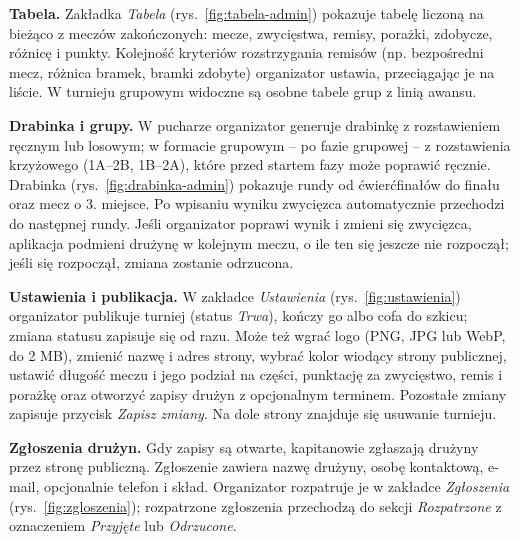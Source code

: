 \documentclass[11pt,a4paper,oneside]{article}
\begin{document}

\textbf{Tabela.} Zakładka \emph{Tabela} (rys.~\ref{fig:tabela-admin}) pokazuje tabelę liczoną na bieżąco z meczów zakończonych: mecze, zwycięstwa, remisy, porażki, zdobycze, różnicę i punkty. Kolejność kryteriów rozstrzygania remisów (np. bezpośredni mecz, różnica bramek, bramki zdobyte) organizator ustawia, przeciągając je na liście. W turnieju grupowym widoczne są osobne tabele grup z linią awansu.


\textbf{Drabinka i grupy.} W pucharze organizator generuje drabinkę z rozstawieniem ręcznym lub losowym; w formacie grupowym -- po fazie grupowej -- z rozstawienia krzyżowego (1A--2B, 1B--2A), które przed startem fazy może poprawić ręcznie. Drabinka (rys.~\ref{fig:drabinka-admin}) pokazuje rundy od ćwierćfinałów do finału oraz mecz o 3. miejsce. Po wpisaniu wyniku zwycięzca automatycznie przechodzi do następnej rundy. Jeśli organizator poprawi wynik i zmieni się zwycięzca, aplikacja podmieni drużynę w kolejnym meczu, o ile ten się jeszcze nie rozpoczął; jeśli się rozpoczął, zmiana zostanie odrzucona.


\textbf{Ustawienia i publikacja.} W zakładce \emph{Ustawienia} (rys.~\ref{fig:ustawienia}) organizator publikuje turniej (status \emph{Trwa}), kończy go albo cofa do szkicu; zmiana statusu zapisuje się od razu. Może też wgrać logo (PNG, JPG lub WebP, do 2 MB), zmienić nazwę i adres strony, wybrać kolor wiodący strony publicznej, ustawić długość meczu i jego podział na części, punktację za zwycięstwo, remis i porażkę oraz otworzyć zapisy drużyn z opcjonalnym terminem. Pozostałe zmiany zapisuje przycisk \emph{Zapisz zmiany}. Na dole strony znajduje się usuwanie turnieju.


\textbf{Zgłoszenia drużyn.} Gdy zapisy są otwarte, kapitanowie zgłaszają drużyny przez stronę publiczną. Zgłoszenie zawiera nazwę drużyny, osobę kontaktową, e-mail, opcjonalnie telefon i skład. Organizator rozpatruje je w zakładce \emph{Zgłoszenia} (rys.~\ref{fig:zgloszenia}); rozpatrzone zgłoszenia przechodzą do sekcji \emph{Rozpatrzone} z oznaczeniem \emph{Przyjęte} lub \emph{Odrzucone}.
\end{document}
